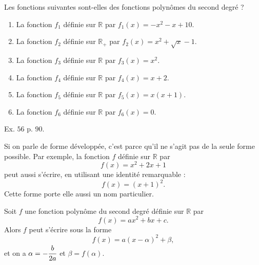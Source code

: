 \documentclass[11pt]{article}
\begin{document}
\begin{exo}
  Les fonctions suivantes sont-elles des fonctions polynômes du second degré ?
  \begin{enumerate}
    \item La fonction $f_1$ définie sur $\mathbb{R}$ par $f_1(x) = -x^2-x+10$.
    \item La fonction $f_2$ définie sur $\mathbb{R_+}$ par $f_2(x) = x^2+\sqrt x-1$.
    \item La fonction $f_3$ définie sur $\mathbb{R}$ par $f_3(x) = x^2$.
    \item La fonction $f_4$ définie sur $\mathbb{R}$ par $f_4(x) = x+2$.
    \item La fonction $f_5$ définie sur $\mathbb{R}$ par $f_5(x) = x(x+1)$.
    \item La fonction $f_6$ définie sur $\mathbb{R}$ par $f_6(x) = 0$.
  \end{enumerate}
\end{exo}

\begin{exo}
  Ex. $56$ p. $90$.
\end{exo}

Si on parle de forme développée, c'est parce qu'il ne s'agit pas de la seule
forme possible. Par exemple, la fonction $f$ définie sur $\mathbb{R}$ par
\[
  f(x) = x^2+2x+1
\]
peut aussi s'écrire, en utilisant une identité remarquable :
\[
  f(x) = (x+1)^2.
\]
Cette forme porte elle aussi un nom particulier.


\begin{prop}
  Soit $f$ une fonction polynôme du second degré définie sur $\mathbb{R}$ par
  \[
    f(x) = ax^2+bx+c.
  \]
  Alors $f$ peut s'écrire sous la forme
  \[
    f(x) = a(x-\alpha)^2+\beta,
  \]
  et on a $\alpha=-\cfrac{b}{2a}$ et $\beta=f(\alpha)$.
\end{prop}
\end{document}
